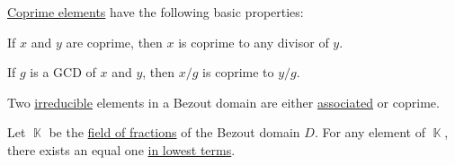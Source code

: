 \begin{proposition}\label{thm:def:coprime_elements}
  \hyperref[def:coprime_elements]{Coprime elements} have the following basic properties:
  \begin{thmenum}
     If \( x \) and \( y \) are coprime, then \( x \) is coprime to any divisor of \( y \).

     If \( g \) is a GCD of \( x \) and \( y \), then \( x / g \) is coprime to \( y / g \).

     Two \hyperref[def:domain_divisibility/irreducible]{irreducible} elements in a Bezout domain are either \hyperref[def:domain_divisibility/associates]{associated} or coprime.

     Let \( \BbbK \) be the \hyperref[thm:field_of_fractions]{field of fractions} of the Bezout domain \( D \). For any element of \( \BbbK \), there exists an equal one \hyperref[def:lowest_terms]{in lowest terms}.
  \end{thmenum}
\end{proposition}
